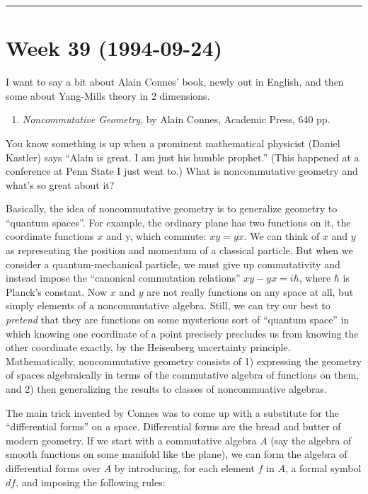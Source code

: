 \documentclass{article}
\def\tightlist{}
\begin{document}
\begin{center}\rule{0.5\linewidth}{0.5pt}\end{center}
\hypertarget{week39}{%
\section{Week 39 (1994-09-24)}\label{week39}}

I want to say a bit about Alain Connes' book, newly out in English, and
then some about Yang-Mills theory in 2 dimensions.

\begin{enumerate}
\def\labelenumi{\arabic{enumi})}
\tightlist
\item
  \emph{Noncommutative Geometry}, by Alain Connes, Academic Press, 640
  pp.
\end{enumerate}

You know something is up when a prominent mathematical physicist (Daniel
Kastler) says ``Alain is great. I am just his humble prophet.'' (This
happened at a conference at Penn State I just went to.) What is
noncommutative geometry and what's so great about it?

Basically, the idea of noncommutative geometry is to generalize geometry
to ``quantum spaces''. For example, the ordinary plane has two functions
on it, the coordinate functions \(x\) and y, which commute: \(xy = yx\).
We can think of \(x\) and \(y\) as representing the position and
momentum of a classical particle. But when we consider a
quantum-mechanical particle, we must give up commutativity and instead
impose the ``canonical commutation relations'' \(xy-yx = i \hbar\),
where \(\hbar\) is Planck's constant. Now \(x\) and \(y\) are not really
functions on any space at all, but simply elements of a noncommutative
algebra. Still, we can try our best to \emph{pretend} that they are
functions on some mysterious sort of ``quantum space'' in which knowing
one coordinate of a point precisely precludes us from knowing the other
coordinate exactly, by the Heisenberg uncertainty principle.
Mathematically, noncommutative geometry consists of 1) expressing the
geometry of spaces algebraically in terms of the commutative algebra of
functions on them, and 2) then generalizing the results to classes of
noncommuative algebras.

The main trick invented by Connes was to come up with a substitute for
the ``differential forms'' on a space. Differential forms are the bread
and butter of modern geometry. If we start with a commutative algebra
\(A\) (say the algebra of smooth functions on some manifold like the
plane), we can form the algebra of differential forms over \(A\) by
introducing, for each element \(f\) in \(A\), a formal symbol \(df\),
and imposing the following rules:
\end{document}
